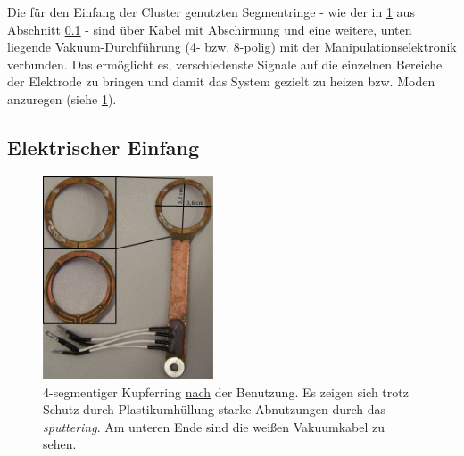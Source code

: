 \documentclass[numbers=noenddot,a4paper]{scrartcl}
\newcommand{\tilt}[1]{\textit{#1}}
\begin{document}
			Die für den Einfang der Cluster genutzten Segmentringe - wie der in \ref{img:ring} aus Abschnitt \ref{sub:einfang} - sind \"uber Kabel mit Abschirmung und eine weitere, unten liegende Vakuum-Durchf\"uhrung (4- bzw. 8-polig) mit der Manipulationselektronik verbunden. Das erm\"oglicht es, verschiedenste Signale auf die einzelnen Bereiche der Elektrode zu bringen und damit das System gezielt zu heizen bzw. Moden anzuregen (siehe \ref{img:ring}). 

		\subsection{Elektrischer Einfang} \label{sub:einfang}

				\begin{figure}
					\centering
					\includegraphics[width=0.45\textwidth,height=0.55\textwidth]{figs/cam/ringelektrode.jpg}
					\caption{4-segmentiger Kupferring \underline{nach} der Benutzung. Es zeigen sich trotz Schutz durch Plastikumhüllung starke Abnutzungen durch das \tilt{sputtering}. Am unteren Ende sind die weißen Vakuumkabel zu sehen.}
					\label{img:ring}
				\end{figure}
\end{document}
